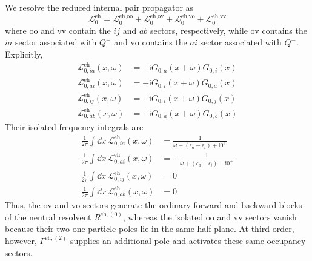 \documentclass[aip,jcp,reprint,noshowkeys,superscriptaddress]{revtex4-1}
\newcommand{\eps}{\epsilon}
\newcommand{\ii}{\mathrm{i}}
\newcommand{\eh}{\text{eh}}
\begin{document}
We resolve the reduced internal pair propagator as
\begin{equation}
    \mathcal L_0^\eh
    =
    \mathcal L_0^{\eh,\text{oo}}
    +
    \mathcal L_0^{\eh,\text{ov}}
    +
    \mathcal L_0^{\eh,\text{vo}}
    +
    \mathcal L_0^{\eh,\text{vv}}
    \label{eq:L0_sector_decomposition}
\end{equation}
where $\text{oo}$ and $\text{vv}$ contain the $ij$ and $ab$ sectors, respectively,
while $\text{ov}$ contains the $ia$ sector associated with $Q^+$ and $\text{vo}$ contains
the $ai$ sector associated with $Q^-$.  Explicitly,
\begin{align}
    \mathcal L_{0,ia}^{\eh}(x,\omega)
    &=
    -\ii G_{0,a}(x+\omega)G_{0,i}(x)
    \\
    \mathcal L_{0,ai}^{\eh}(x,\omega)
    &=
    -\ii G_{0,i}(x+\omega)G_{0,a}(x)
    \\
    \mathcal L_{0,ij}^{\eh}(x,\omega)
    &=
    -\ii G_{0,i}(x+\omega)G_{0,j}(x)
    \\
    \mathcal L_{0,ab}^{\eh}(x,\omega)
    &=
    -\ii G_{0,a}(x+\omega)G_{0,b}(x)
    \label{eq:L0_eh_reduced_sectors}
\end{align}
Their isolated frequency integrals are
\begin{align}
    \frac{1}{2\pi}\int\dd{x}\,
    \mathcal L_{0,ia}^{\eh}(x,\omega)
    &=
    \frac{1}{\omega-(\eps_a-\eps_i)+\ii0^+}
    \label{eq:eh_ov_integral}
    \\
    \frac{1}{2\pi}\int\dd{x}\,
    \mathcal L_{0,ai}^{\eh}(x,\omega)
    &=
    -\frac{1}{\omega+(\eps_a-\eps_i)-\ii0^+}
    \label{eq:eh_vo_integral}
    \\
    \frac{1}{2\pi}\int\dd{x}\,
    \mathcal L_{0,ij}^{\eh}(x,\omega)
    &=0
    \\
    \frac{1}{2\pi}\int\dd{x}\,
    \mathcal L_{0,ab}^{\eh}(x,\omega)
    &=0
    \label{eq:same_occupancy_bubbles_zero}
\end{align}
Thus, the $\text{ov}$ and $\text{vo}$ sectors generate the ordinary forward and
backward blocks of the neutral resolvent $R^{\eh,(0)}$, whereas the isolated
$\text{oo}$ and $\text{vv}$ sectors vanish because their two one-particle poles lie in
the same half-plane.  At third order, however, $\Gamma^{\eh,(2)}$ supplies an
additional pole and activates these same-occupancy sectors.
\end{document}

